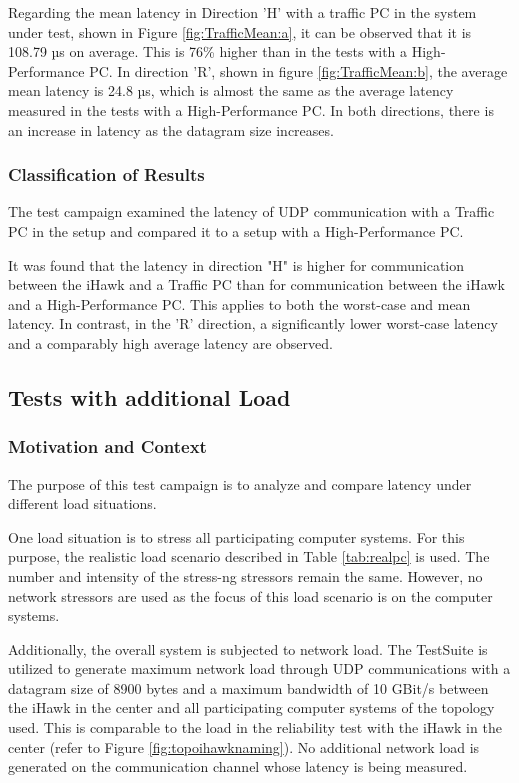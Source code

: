 Regarding the mean latency in Direction 'H' with a traffic PC in the system under test, shown in Figure \ref{fig:TrafficMean:a}, it can be observed that it is 108.79 µs on average. This is 76\% higher than in the tests with a High-Performance PC. In direction 'R', shown in figure \ref{fig:TrafficMean:b}, the average mean latency is 24.8 µs, which is almost the same as the average latency measured in the tests with a High-Performance PC. In both directions, there is an increase in latency as the datagram size increases.

\subsubsection{Classification of Results}
The test campaign examined the latency of UDP communication with a Traffic PC in the setup and compared it to a setup with a High-Performance PC.

It was found that the latency in direction "H" is higher for communication between the iHawk and a Traffic PC than for communication between the iHawk and a High-Performance PC. This applies to both the worst-case and mean latency. In contrast, in the 'R' direction, a significantly lower worst-case latency and a comparably high average latency are observed.


\subsection{Tests with additional Load}
\subsubsection{Motivation and Context}
The purpose of this test campaign is to analyze and compare latency under different load situations.

One load situation is to stress all participating computer systems. For this purpose, the realistic load scenario described in Table \ref{tab:realpc} is used. The number and intensity of the stress-ng stressors remain the same. However, no network stressors are used as the focus of this load scenario is on the computer systems.

Additionally, the overall system is subjected to network load. The TestSuite is utilized to generate maximum network load through UDP communications with a datagram size of 8900 bytes and a maximum bandwidth of 10 GBit/s between the iHawk in the center and all participating computer systems of the topology used. This is comparable to the load in the reliability test with the iHawk in the center (refer to Figure \ref{fig:topoihawknaming}). No additional network load is generated on the communication channel whose latency is being measured.

